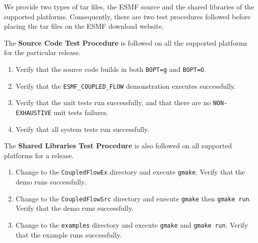 We provide two types of tar files, the ESMF source and the shared
libraries of the supported platforms. Consequently, there are two test
procedures followed before placing the tar files on the ESMF download website. 

The {\bf Source Code Test Procedure} is followed on all the supported
platforms for the particular release.

\begin{enumerate}
\item Verify that the source code builds in both {\tt BOPT=g} and {\tt BOPT=O}.
\item Verify that  the {\tt ESMF\_COUPLED\_FLOW} demonstration executes successfully.
\item Verify that the unit tests run successfully, and that there are no {\tt NON-EXHAUSTIVE} unit tests  failures.
\item Verify that all system tests run successfully. 
\end{enumerate}

The {\bf Shared Libraries Test Procedure} is also followed on all supported
platforms for a release.

\begin{enumerate}
\item Change to the {\tt CoupledFlowEx} directory and execute {\tt gmake}. Verify that the demo runs successfully.
\item Change to the {\tt CoupledFlowSrc} directory and execute {\tt gmake} then {\tt gmake run}. Verify that the demo runs successfully.
\item Change to the {\tt examples} directory and execute {\tt gmake} and {\tt gmake run}. Verify that the example runs successfully.
\end{enumerate}














